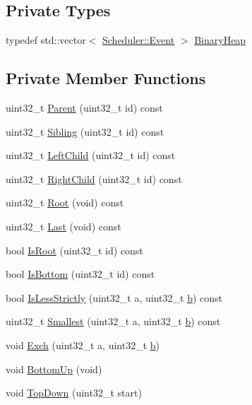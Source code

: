 \subsection*{Private Types}
\begin{DoxyCompactItemize}
\item 
typedef std\+::vector$<$ \hyperlink{structns3_1_1Scheduler_1_1Event}{Scheduler\+::\+Event} $>$ \hyperlink{classns3_1_1HeapScheduler_a54aa30c97bec500ae47a0e8280cf6457}{Binary\+Heap}
\end{DoxyCompactItemize}
\subsection*{Private Member Functions}
\begin{DoxyCompactItemize}
\item 
uint32\+\_\+t \hyperlink{classns3_1_1HeapScheduler_a9f03652701d533d0d7aeebd9e8ee8540}{Parent} (uint32\+\_\+t id) const 
\item 
uint32\+\_\+t \hyperlink{classns3_1_1HeapScheduler_a9cbf61dd8b2c25a150ae6a709a4f86ca}{Sibling} (uint32\+\_\+t id) const 
\item 
uint32\+\_\+t \hyperlink{classns3_1_1HeapScheduler_a688a28cdd388601b26e23d22701d978e}{Left\+Child} (uint32\+\_\+t id) const 
\item 
uint32\+\_\+t \hyperlink{classns3_1_1HeapScheduler_a7c0bc52c00e773ff66413dd7f4eece47}{Right\+Child} (uint32\+\_\+t id) const 
\item 
uint32\+\_\+t \hyperlink{classns3_1_1HeapScheduler_afed423f2a8e0e2a00d1d6b8449854505}{Root} (void) const 
\item 
uint32\+\_\+t \hyperlink{classns3_1_1HeapScheduler_abb241faada46b0d23f7029177e1a91f3}{Last} (void) const 
\item 
bool \hyperlink{classns3_1_1HeapScheduler_ad5876ca60bc62a5795bff24deb01c4fe}{Is\+Root} (uint32\+\_\+t id) const 
\item 
bool \hyperlink{classns3_1_1HeapScheduler_aa5ba644512dfabfbc77da2b64dbe4f20}{Is\+Bottom} (uint32\+\_\+t id) const 
\item 
bool \hyperlink{classns3_1_1HeapScheduler_a28140c577cfb8cac67a196420bdd469f}{Is\+Less\+Strictly} (uint32\+\_\+t a, uint32\+\_\+t \hyperlink{lte__pathloss_8m_a21ad0bd836b90d08f4cf640b4c298e7c}{b}) const 
\item 
uint32\+\_\+t \hyperlink{classns3_1_1HeapScheduler_a1906ea79fb718ebfae55caecffef42ec}{Smallest} (uint32\+\_\+t a, uint32\+\_\+t \hyperlink{lte__pathloss_8m_a21ad0bd836b90d08f4cf640b4c298e7c}{b}) const 
\item 
void \hyperlink{classns3_1_1HeapScheduler_a0ae45a30345747a7c3e26bc1a5b5248c}{Exch} (uint32\+\_\+t a, uint32\+\_\+t \hyperlink{lte__pathloss_8m_a21ad0bd836b90d08f4cf640b4c298e7c}{b})
\item 
void \hyperlink{classns3_1_1HeapScheduler_aee0e91bc6e951d1ad4a1425e9340164c}{Bottom\+Up} (void)
\item 
void \hyperlink{classns3_1_1HeapScheduler_a2ea4d0e4c77dd66465a255322d59af27}{Top\+Down} (uint32\+\_\+t start)
\end{DoxyCompactItemize}
